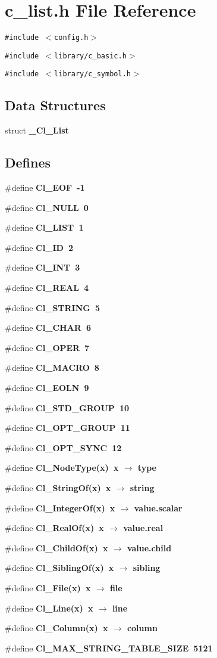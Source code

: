 \section{c\_\-list.h File Reference}
\label{c__list_8h}
{\tt \#include $<$config.h$>$}\par
{\tt \#include $<$library/c\_\-basic.h$>$}\par
{\tt \#include $<$library/c\_\-symbol.h$>$}\par
\subsection*{Data Structures}
\begin{CompactItemize}
\item 
struct \bf{\_\-Cl\_\-List}
\end{CompactItemize}
\subsection*{Defines}
\begin{CompactItemize}
\item 
\#define \bf{Cl\_\-EOF}~-1
\item 
\#define \bf{Cl\_\-NULL}~0
\item 
\#define \bf{Cl\_\-LIST}~1
\item 
\#define \bf{Cl\_\-ID}~2
\item 
\#define \bf{Cl\_\-INT}~3
\item 
\#define \bf{Cl\_\-REAL}~4
\item 
\#define \bf{Cl\_\-STRING}~5
\item 
\#define \bf{Cl\_\-CHAR}~6
\item 
\#define \bf{Cl\_\-OPER}~7
\item 
\#define \bf{Cl\_\-MACRO}~8
\item 
\#define \bf{Cl\_\-EOLN}~9
\item 
\#define \bf{Cl\_\-STD\_\-GROUP}~10
\item 
\#define \bf{Cl\_\-OPT\_\-GROUP}~11
\item 
\#define \bf{Cl\_\-OPT\_\-SYNC}~12
\item 
\#define \bf{Cl\_\-Node\-Type}(x)~x $\rightarrow$ type
\item 
\#define \bf{Cl\_\-String\-Of}(x)~x $\rightarrow$ string
\item 
\#define \bf{Cl\_\-Integer\-Of}(x)~x $\rightarrow$ value.scalar
\item 
\#define \bf{Cl\_\-Real\-Of}(x)~x $\rightarrow$ value.real
\item 
\#define \bf{Cl\_\-Child\-Of}(x)~x $\rightarrow$ value.child
\item 
\#define \bf{Cl\_\-Sibling\-Of}(x)~x $\rightarrow$ sibling
\item 
\#define \bf{Cl\_\-File}(x)~x $\rightarrow$ \bf{file}
\item 
\#define \bf{Cl\_\-Line}(x)~x $\rightarrow$ line
\item 
\#define \bf{Cl\_\-Column}(x)~x $\rightarrow$ column
\item 
\#define \bf{Cl\_\-MAX\_\-STRING\_\-TABLE\_\-SIZE}~5121
\end{CompactItemize}
